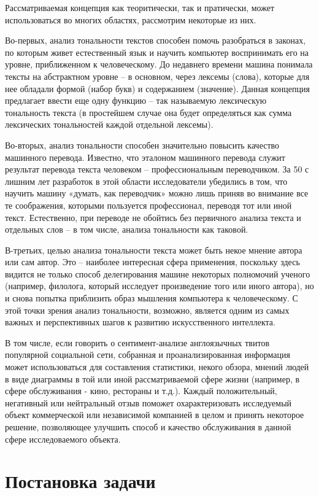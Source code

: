 \documentclass[14pt,a4paper]{scrartcl}
\begin{document}
Рассматриваемая концепция как теоритически, так и пратически, может использоваться во многих областях, рассмотрим некоторые из них. 

Во-первых, анализ тональности текстов способен помочь разобраться в законах, по которым живет естественный язык и научить компьютер воспринимать его на уровне, приближенном к человеческому. До недавнего времени машина понимала тексты на абстрактном уровне – в основном, через лексемы (слова), которые для нее обладали формой (набор букв) и содержанием (значение). Данная концепция предлагает ввести еще одну функцию – так называемую лексическую тональность текста (в простейшем случае она будет определяться как сумма лексических тональностей каждой отдельной лексемы).

Во-вторых, анализ тональности способен значительно повысить качество машинного перевода. Известно, что эталоном машинного перевода служит результат перевода текста человеком – профессиональным переводчиком. За 50 с лишним лет разработок в этой области исследователи убедились в том, что научить машину «думать, как переводчик» можно лишь приняв во внимание все те соображения, которыми пользуется профессионал, переводя тот или иной текст. Естественно, при переводе не обойтись без первичного анализа текста и отдельных слов – в том числе, анализа тональности как таковой.

В-третьих, целью анализа тональности текста может быть некое мнение автора или сам автор. Это – наиболее интересная сфера применения, поскольку здесь видится не только способ делегирования машине некоторых полномочий ученого (например, филолога, который исследует произведение того или иного автора), но и снова попытка приблизить образ мышления компьютера к человеческому. С этой точки зрения анализ тональности, возможно, является одним из самых важных и перспективных шагов к развитию искусственного интеллекта.

В том числе, если говорить о сентимент-анализе англоязычных твитов популярной социальной сети, собранная и проанализированная информация может использоваться для составления статистики, некого обзора, мнений людей в виде диаграммы в той или иной рассматриваемой сфере жизни (например, в сфере обслуживания - кино, рестораны и т.д.). Каждый положительный, негативный или нейтральный отзыв поможет охарактеризовать исследуемый объект коммерческой или независимой компанией в целом и принять некоторое решение, позволяющее улучшить способ и качество обслуживания в данной сфере исследоваемого объекта.
\newpage
\section{Постановка задачи}
\end{document}
